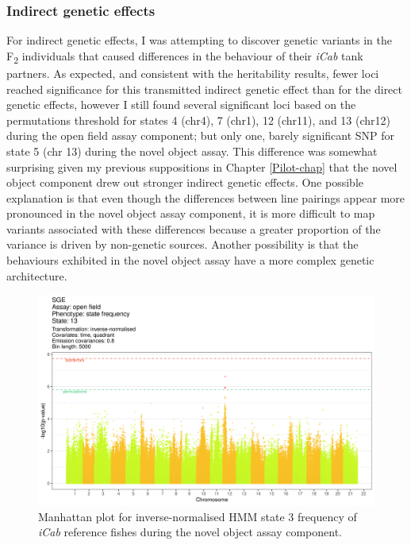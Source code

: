 \documentclass[
]{book}
\begin{document}
\hypertarget{indirect-genetic-effects-2}{%
\subsubsection{Indirect genetic effects}\label{indirect-genetic-effects-2}}

For indirect genetic effects, I was attempting to discover genetic variants in the F\textsubscript{2} individuals that caused differences in the behaviour of their \emph{\textcolor{iCab_424B4D}{iCab}} tank partners. As expected, and consistent with the heritability results, fewer loci reached significance for this transmitted indirect genetic effect than for the direct genetic effects, however I still found several significant loci based on the permutations threshold for states 4 (chr4), 7 (chr1), 12 (chr11), and 13 (chr12) during the open field assay component; but only one, barely significant SNP for state 5 (chr 13) during the novel object assay. This difference was somewhat surprising given my previous suppositions in Chapter \ref{Pilot-chap} that the novel object component drew out stronger indirect genetic effects. One possible explanation is that even though the differences between line pairings appear more pronounced in the novel object assay component, it is more difficult to map variants associated with these differences because a greater proportion of the variance is driven by non-genetic sources. Another possibility is that the behaviours exhibited in the novel object assay have a more complex genetic architecture.



\begin{figure}
\includegraphics[width=1\linewidth]{figs/mikk_behaviour/manhattans/sge_of_13_time-quadrant} \caption{Manhattan plot for inverse-normalised HMM state 3 frequency of \emph{\textcolor{iCab_424B4D}{iCab}} reference fishes during the novel object assay component.}\label{fig:F2-man-sge-of-13}
\end{figure}
\end{document}
